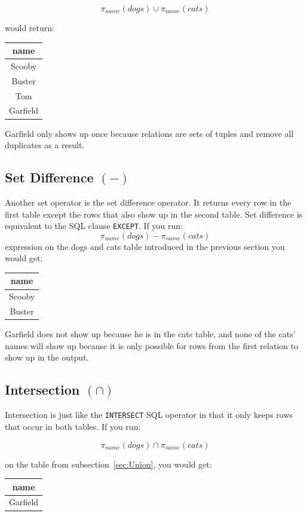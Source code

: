 \documentclass{article}
\begin{document}
\[
    \pi_{name}(dogs) \cup \pi_{name}(cats)
\]

would return:
\begin{center}
\begin{tabular}{|c|}
\hline
\textbf{name}\\
\hline
Scooby \\
Buster \\
Tom \\
Garfield \\
\hline
\end{tabular}
\end{center}

Garfield only shows up once because relations are sets of tuples and remove all duplicates as a result.

\subsection{Set Difference $(-)$}
Another set operator is the set difference operator. It returns every row in the first table except the rows that also show up in the second table. Set difference is equivalent to the SQL clause \texttt{EXCEPT}. If you run:
\[
\pi_{name}(dogs) - \pi_{name}(cats)
\]
expression on the dogs and cats table introduced in the previous section you would get:
\begin{center}
\begin{tabular}{|c|}
\hline
\textbf{name}\\
\hline
Scooby \\
Buster \\
\hline
\end{tabular}
\end{center}

Garfield does not show up because he is in the cats table, and none of the cats’ names will show up because it is only possible for rows from the first relation to show up in the output.

\subsection{Intersection $(\cap)$}
Intersection is just like the \texttt{INTERSECT} SQL operator in that it only keeps rows that occur in both tables. If you run:

\[
\pi_{name}(dogs) \cap \pi_{name}(cats)
\]

on the table from subsection~\ref{sec:Union}, you would get:

\begin{center}
\begin{tabular}{|c|}
\hline
\textbf{name}\\
\hline
Garfield \\
\hline
\end{tabular}
\end{center}
\end{document}
